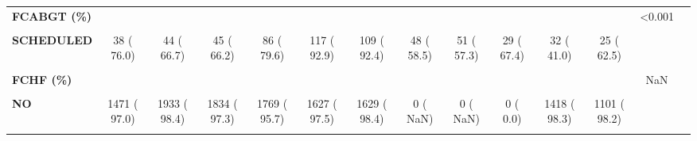 \documentclass[
]{article}
\begin{document}
\begin{table}[H]
\begin{tabular}[t]{>{\raggedright\arraybackslash}p{5em}ccccccccccccc}
\textbf{FCABGT (\%)} &  &  &  &  &  &  &  &  &  &  &  & <0.001 & \\
\textbf{\cellcolor{gray!10}{NO}} & \cellcolor{gray!10}{0 (  0.0)} & \cellcolor{gray!10}{0 (  0.0)} & \cellcolor{gray!10}{0 (  0.0)} & \cellcolor{gray!10}{0 (  0.0)} & \cellcolor{gray!10}{0 (  0.0)} & \cellcolor{gray!10}{0 (  0.0)} & \cellcolor{gray!10}{0 (  0.0)} & \cellcolor{gray!10}{0 (  0.0)} & \cellcolor{gray!10}{0 (  0.0)} & \cellcolor{gray!10}{0 (  0.0)} & \cellcolor{gray!10}{3 (  7.5)} & \cellcolor{gray!10}{} & \cellcolor{gray!10}{}\\
\textbf{SCHEDULED} & 38 ( 76.0) & 44 ( 66.7) & 45 ( 66.2) & 86 ( 79.6) & 117 ( 92.9) & 109 ( 92.4) & 48 ( 58.5) & 51 ( 57.3) & 29 ( 67.4) & 32 ( 41.0) & 25 ( 62.5) &  & \\
\textbf{\cellcolor{gray!10}{URGENT}} & \cellcolor{gray!10}{12 ( 24.0)} & \cellcolor{gray!10}{22 ( 33.3)} & \cellcolor{gray!10}{23 ( 33.8)} & \cellcolor{gray!10}{22 ( 20.4)} & \cellcolor{gray!10}{9 (  7.1)} & \cellcolor{gray!10}{9 (  7.6)} & \cellcolor{gray!10}{34 ( 41.5)} & \cellcolor{gray!10}{38 ( 42.7)} & \cellcolor{gray!10}{14 ( 32.6)} & \cellcolor{gray!10}{46 ( 59.0)} & \cellcolor{gray!10}{12 ( 30.0)} & \cellcolor{gray!10}{} & \cellcolor{gray!10}{}\\
\textbf{FCHF (\%)} &  &  &  &  &  &  &  &  &  &  &  & NaN & \\
\textbf{\cellcolor{gray!10}{No}} & \cellcolor{gray!10}{0 (  0.0)} & \cellcolor{gray!10}{0 (  0.0)} & \cellcolor{gray!10}{0 (  0.0)} & \cellcolor{gray!10}{0 (  0.0)} & \cellcolor{gray!10}{0 (  0.0)} & \cellcolor{gray!10}{0 (  0.0)} & \cellcolor{gray!10}{0 (  NaN)} & \cellcolor{gray!10}{0 (  NaN)} & \cellcolor{gray!10}{1383 ( 99.0)} & \cellcolor{gray!10}{0 (  0.0)} & \cellcolor{gray!10}{0 (  0.0)} & \cellcolor{gray!10}{} & \cellcolor{gray!10}{}\\
\textbf{NO} & 1471 ( 97.0) & 1933 ( 98.4) & 1834 ( 97.3) & 1769 ( 95.7) & 1627 ( 97.5) & 1629 ( 98.4) & 0 (  NaN) & 0 (  NaN) & 0 (  0.0) & 1418 ( 98.3) & 1101 ( 98.2) &  & \\
\textbf{\cellcolor{gray!10}{Yes}} & \cellcolor{gray!10}{0 (  0.0)} & \cellcolor{gray!10}{0 (  0.0)} & \cellcolor{gray!10}{0 (  0.0)} & \cellcolor{gray!10}{0 (  0.0)} & \cellcolor{gray!10}{0 (  0.0)} & \cellcolor{gray!10}{0 (  0.0)} & \cellcolor{gray!10}{0 (  NaN)} & \cellcolor{gray!10}{0 (  NaN)} & \cellcolor{gray!10}{14 (  1.0)} & \cellcolor{gray!10}{0 (  0.0)} & \cellcolor{gray!10}{0 (  0.0)} & \cellcolor{gray!10}{} & \cellcolor{gray!10}{}\\

\end{tabular}
\end{table}
\end{document}
